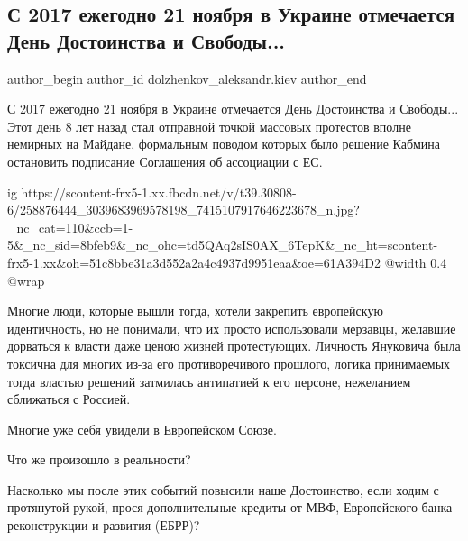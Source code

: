  
 
 
 
 
 
\subsection{С 2017 ежегодно 21 ноября в Украине отмечается День Достоинства и Свободы...}
\label{sec:21_11_2021.fb.dolzhenkov_aleksandr.kiev.1.den_dostoinstva_svobody}
 
\ifcmt
 author_begin
   author_id dolzhenkov_aleksandr.kiev
 author_end
\fi

С 2017 ежегодно 21 ноября в Украине отмечается День Достоинства и Свободы...
Этот день 8 лет назад стал отправной точкой массовых протестов вполне немирных
на Майдане, формальным поводом которых было решение Кабмина остановить
подписание Соглашения об ассоциации с ЕС.

\ifcmt
  ig https://scontent-frx5-1.xx.fbcdn.net/v/t39.30808-6/258876444_3039683969578198_7415107917646223678_n.jpg?_nc_cat=110&ccb=1-5&_nc_sid=8bfeb9&_nc_ohc=td5QAq2sIS0AX_6TepK&_nc_ht=scontent-frx5-1.xx&oh=51c8bbe31a3d552a2a4c4937d9951eaa&oe=61A394D2
  @width 0.4
  @wrap 
\fi

Многие люди, которые вышли тогда, хотели закрепить европейскую идентичность, но
не понимали, что их просто использовали мерзавцы, желавшие дорваться к власти
даже ценою жизней протестующих. Личность Януковича была токсична для многих
из-за его противоречивого прошлого, логика принимаемых тогда властью решений
затмилась антипатией к его персоне, нежеланием сближаться с Россией. 

Многие уже себя увидели в Европейском Союзе.

Что же произошло в реальности?

Насколько мы после этих событий повысили наше Достоинство, если ходим с
протянутой рукой, прося дополнительные кредиты от МВФ, Европейского банка
реконструкции и развития (ЕБРР)?

